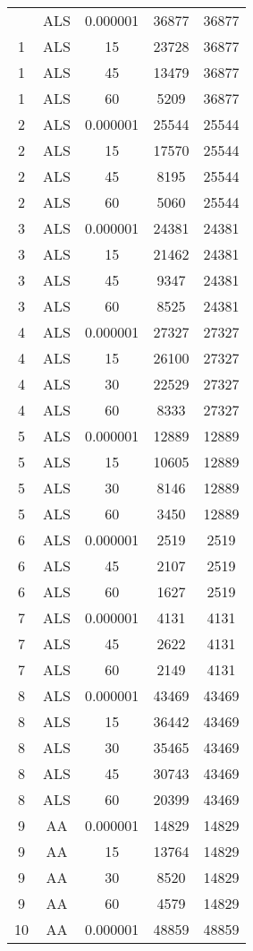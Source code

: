 \begin{center}
\begin{longtable}{ccccc}
\hline \hline
\endlastfoot	
1	&	ALS	&	0.000001	&	36877	&	36877	\\
1	&	ALS	&	15	&	23728	&	36877	\\
1	&	ALS	&	45	&	13479	&	36877	\\
1	&	ALS	&	60	&	5209	&	36877	\\
2	&	ALS	&	0.000001	&	25544	&	25544	\\
2	&	ALS	&	15	&	17570	&	25544	\\
2	&	ALS	&	45	&	8195	&	25544	\\
2	&	ALS	&	60	&	5060	&	25544	\\
3	&	ALS	&	0.000001	&	24381	&	24381	\\
3	&	ALS	&	15	&	21462	&	24381	\\
3	&	ALS	&	45	&	9347	&	24381	\\
3	&	ALS	&	60	&	8525	&	24381	\\
4	&	ALS	&	0.000001	&	27327	&	27327	\\
4	&	ALS	&	15	&	26100	&	27327	\\
4	&	ALS	&	30	&	22529	&	27327	\\
4	&	ALS	&	60	&	8333	&	27327	\\
5	&	ALS	&	0.000001	&	12889	&	12889	\\
5	&	ALS	&	15	&	10605	&	12889	\\
5	&	ALS	&	30	&	8146	&	12889	\\
5	&	ALS	&	60	&	3450	&	12889	\\
6	&	ALS	&	0.000001	&	2519	&	2519	\\
6	&	ALS	&	45	&	2107	&	2519	\\
6	&	ALS	&	60	&	1627	&	2519	\\
7	&	ALS	&	0.000001	&	4131	&	4131	\\
7	&	ALS	&	45	&	2622	&	4131	\\
7	&	ALS	&	60	&	2149	&	4131	\\
8	&	ALS	&	0.000001	&	43469	&	43469	\\
8	&	ALS	&	15	&	36442	&	43469	\\
8	&	ALS	&	30	&	35465	&	43469	\\
8	&	ALS	&	45	&	30743	&	43469	\\
8	&	ALS	&	60	&	20399	&	43469	\\
9	&	AA	&	0.000001	&	14829	&	14829	\\
9	&	AA	&	15	&	13764	&	14829	\\
9	&	AA	&	30	&	8520	&	14829	\\
9	&	AA	&	60	&	4579	&	14829	\\
10	&	AA	&	0.000001	&	48859	&	48859	\\

\end{longtable}
\end{center}
